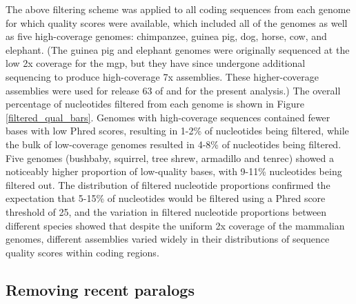 The above filtering scheme was applied to all coding sequences from
each genome for which quality scores were available, which included
all of the \lcv genomes as well as five high-coverage genomes:
chimpanzee, guinea pig, dog, horse, cow, and elephant. (The guinea pig
and elephant genomes were originally sequenced at the low 2x coverage
for the \ac{mgp}, but they have since undergone additional sequencing
to produce high-coverage 7x assemblies. These higher-coverage
assemblies were used for release 63 of \ens and for the present
analysis.) The overall percentage of nucleotides filtered from each
genome is shown in Figure \ref{filtered_qual_bars}. Genomes with
high-coverage sequences contained fewer bases with low Phred scores,
resulting in 1-2\% of nucleotides being filtered, while the bulk of
low-coverage genomes resulted in 4-8\% of nucleotides being filtered.
Five genomes (bushbaby, squirrel, tree shrew, armadillo and tenrec)
showed a noticeably higher proportion of low-quality bases, with
9-11\% nucleotides being filtered out. The distribution of filtered
nucleotide proportions confirmed the expectation that 5-15\% of
nucleotides would be filtered using a Phred score threshold of 25, and
the variation in filtered nucleotide proportions between different
\lcv species showed that despite the uniform 2x coverage of the \lcv
mammalian genomes, different assemblies varied widely in their
distributions of sequence quality scores within coding regions.

\subsection{Removing recent paralogs}
\label{sec_removing_paralogs}


